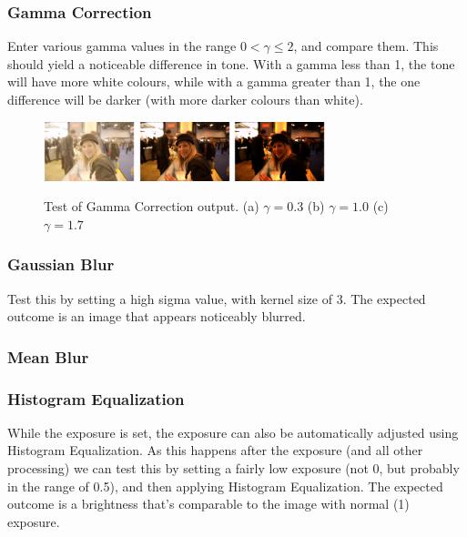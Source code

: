 \documentclass[11pt,a4paper]{article}
\begin{document}
\subsubsection{Gamma Correction}
Enter various gamma values in the range $0 < \gamma \leq 2$, and compare them. This should yield a noticeable difference in tone. With a gamma less than 1,
the tone will have more white colours, while with a gamma greater than 1, the one difference will be darker (with more darker colours than white).

\begin{figure}
   \centering
   \subfigure
   {
       \includegraphics[width=100px]{gammacorrectionlow}
   }
   \subfigure
   {
       \includegraphics[width=100px]{gammacorrection_normal}
   }
   \subfigure
   {
       \includegraphics[width=100px]{gammacorrectionhigh}
   }
   \caption{
       Test of Gamma Correction output. 
       (a) $\gamma = 0.3$
       (b) $\gamma = 1.0$
       (c) $\gamma = 1.7$
   }
   
\end{figure}
\subsubsection{Gaussian Blur}
Test this by setting a high sigma value, with kernel size of 3. The expected outcome is an image that appears noticeably blurred.
\subsubsection{Mean Blur}

\subsubsection{Histogram Equalization}
While the exposure is set, the exposure can also be automatically adjusted using Histogram Equalization. As this happens after the exposure (and all other processing)
we can test this by setting a fairly low exposure (not 0, but probably in the range of 0.5), and then applying Histogram Equalization. The expected outcome is a brightness
that's comparable to the image with normal (1) exposure.
\end{document}
